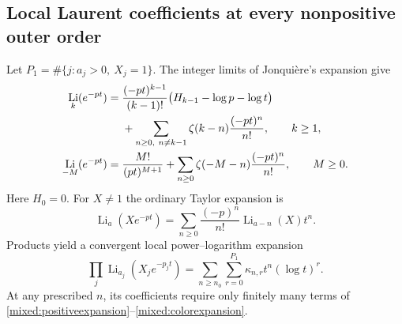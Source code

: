 \documentclass[11pt]{article}
\numberwithin{equation}{section}
\theoremstyle{plain}
\theoremstyle{definition}
\theoremstyle{remark}
\DeclareMathOperator{\Li}{Li}
\begin{document}
\subsection{Local Laurent coefficients at every nonpositive outer order}

Let $P_1=\#\{j:a_j>0,\ X_j=1\}$. The integer limits of
Jonqui\`ere's expansion \cite[Eq. 25.12.12]{DLMFPolylog} give
\begin{align}\label{mixed:positiveexpansion}
 \Li_k(e^{-pt})
 ={}&\frac{(-pt)^{k-1}}{(k-1)!}
          \bigl(H_{k-1}-\log p-\log t\bigr)\notag\\
 &+\sum_{n\ge0,\ n\ne k-1}\zeta(k-n)\frac{(-pt)^n}{n!},
       \qquad k\ge1,\\
 \Li_{-M}(e^{-pt})
 ={}&\frac{M!}{(pt)^{M+1}}
          +\sum_{n\ge0}\zeta(-M-n)\frac{(-pt)^n}{n!},
       \qquad M\ge0.\label{mixed:negativeexpansion}
\end{align}
Here $H_0=0$. For $X\ne1$ the ordinary Taylor expansion is
\begin{equation}\label{mixed:colorexpansion}
 \Li_a(Xe^{-pt})=
       \sum_{n\ge0}\frac{(-p)^n}{n!}\Li_{a-n}(X)t^n.
\end{equation}
Products yield a convergent local power--logarithm expansion
\begin{equation}\label{mixed:local}
 \prod_j\Li_{a_j}(X_je^{-p_jt})
       =\sum_{n\ge n_0}\sum_{r=0}^{P_1}
                                  \kappa_{n,r}t^n(\log t)^r.
\end{equation}
At any prescribed $n$, its coefficients require only finitely many
terms of \eqref{mixed:positiveexpansion}--\eqref{mixed:colorexpansion}.
\end{document}
